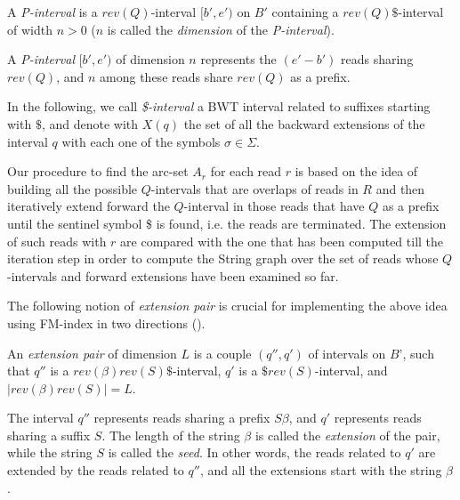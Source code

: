 \documentclass[runningheads,envcountsame,a4paper]{llncs}
\begin{document}
\begin{definition}
A \emph{P-interval} is a $rev(Q)$-interval $[b',e')$ on $B'$ containing a $rev(Q)\$$-interval of width $n>0$ ($n$ is called the \emph{dimension} of the \emph{P-interval}).
\end{definition}

A \emph{P-interval} $[b',e')$ of dimension $n$ represents the $(e'-b')$ reads sharing $rev(Q)$, and $n$ among these reads share $rev(Q)$ as a prefix.



In the following, we call \emph{\$-interval} a BWT interval related to suffixes starting with $\$$, and denote with $X(q)$ the set of all the backward extensions of the interval $q$ with each one of the symbols $\sigma \in \Sigma$.


Our  procedure to find the arc-set $A_r$ for each read $r$   is based on the idea of  building all the possible $Q$-intervals that are overlaps of reads in $R$ and then iteratively extend
forward the $Q$-interval in those reads that have $Q$ as a prefix until the sentinel symbol \$ is found, i.e. the reads are terminated. The extension of such reads with $r$ are compared with the one
that has been computed till the iteration step in order to compute  the String graph over the set of  reads whose $Q$-intervals and forward extensions have been examined so far.

The following notion of \emph{extension pair} is crucial for implementing the above idea using FM-index in two directions (\cite{lam}).


\begin{definition}
\label{extension-pair}
An \emph{extension pair} of dimension $L$ is a couple $(q'', q')$ of intervals on $B’$, such that $q''$ is a $rev(\beta)rev(S)\$$-interval, $q'$ is a $\$rev(S)$-interval,
and $|rev(\beta)rev(S)| = L$.
\end{definition}

The interval $q''$ represents reads sharing a prefix $S\beta$, and $q'$ represents reads sharing a suffix $S$. The length of the string $\beta$ is called the \emph{extension} of the pair, while the string $S$ is called the \emph{seed}. In other words, the reads related to $q'$ are extended by the reads related to $q''$, and all the extensions start with the string $\beta$.
\end{document}
